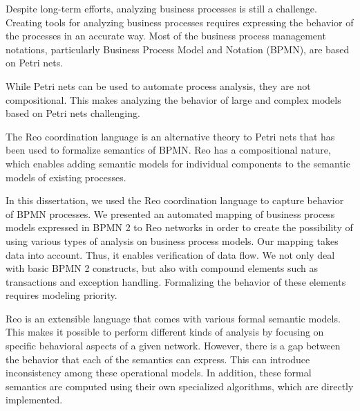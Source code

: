 Despite long-term efforts, analyzing business processes is still a challenge. 
Creating tools for analyzing business processes requires expressing the behavior of the processes in an accurate way. Most of the business process management notations, particularly Business Process Model and Notation (BPMN), are based on Petri nets. 

While Petri nets can be used to automate process analysis, they are not compositional. This makes analyzing the behavior of large and complex models based on Petri nets challenging. %

The Reo coordination language is an alternative theory to Petri nets that has been used to formalize semantics of BPMN. Reo has a compositional nature, which enables adding semantic models for individual components to the semantic models of existing processes. %

In this dissertation, we used the Reo coordination language to capture behavior of BPMN processes.  
We presented an automated mapping of business process models expressed in BPMN 2 to Reo networks in order to create the possibility of using various types of analysis on business process models. Our mapping takes data into account. Thus, it enables verification of  data flow.  
 We not only deal with basic BPMN 2 constructs, but also with compound elements such as transactions and exception handling. Formalizing the behavior of these elements requires modeling priority. %

Reo is an extensible language that comes with various formal semantic models. This makes it possible to perform different kinds of analysis by focusing on specific behavioral aspects of a given network. However, there is a gap between the behavior that each of the semantics can express. This can introduce inconsistency among these operational models. In addition, these formal semantics are computed using their own specialized algorithms, which are directly implemented. %

